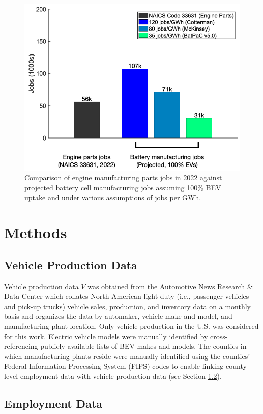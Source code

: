\documentclass[sn-mathphys,Numbered]{sn-jnl}%
\begin{document}
\begin{figure}[ht]
\centering
\includegraphics[width=0.8\linewidth]{figures/fig_engine_parts.png}
\caption{Comparison of engine manufacturing parts jobs in 2022 against projected battery cell manufacturing jobs assuming 100\% BEV uptake and under various assumptions of jobs per GWh.}
\label{fig:engine-jobs}
\end{figure}


\section{Methods}

\subsection{Vehicle Production Data}
\label{sec:veh}

Vehicle production data $V$ was obtained from the Automotive News Research \& Data Center \cite{Automotive_News2023-pg} which collates North American light-duty (i.e., passenger vehicles and pick-up trucks) vehicle sales, production, and inventory data on a monthly basis and organizes the data by automaker, vehicle make and model, and manufacturing plant location. Only vehicle production in the U.S. was considered for this work. Electric vehicle models were manually identified by cross-referencing publicly available lists of BEV makes and models. The counties in which manufacturing plants reside were manually identified using the counties' Federal Information Processing System (FIPS) codes to enable linking county-level employment data with vehicle production data (see Section \ref{sec:emp}).

\subsection{Employment Data}
\label{sec:emp}
\end{document}
